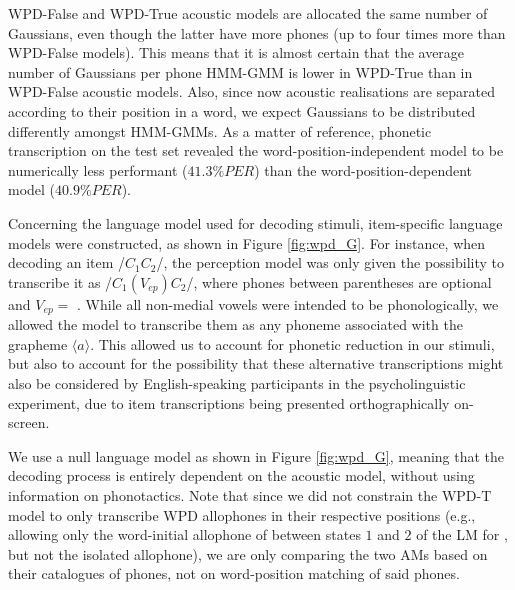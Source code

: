 {WPD-False and WPD-True acoustic models are allocated the same number of Gaussians, even though the latter have more phones (up to four times more than WPD-False models). This means that it is almost certain that the average number of Gaussians per phone HMM-GMM is lower in WPD-True than in WPD-False acoustic models. Also, since now acoustic realisations are separated according to their position in a word, we expect Gaussians to be distributed differently amongst HMM-GMMs. As a matter of reference, phonetic transcription on the test set revealed the word-position-independent model to be numerically less performant ($41.3 \%PER$) than the word-position-dependent model ($40.9 \%PER$).  

Concerning the language model used for decoding stimuli, item-specific language models were constructed, as shown in Figure \ref{fig:wpd_G}. For instance, when decoding an item /$C_{1}C_{2}$/, the perception model was only given the possibility to transcribe it as /$C_{1}(V_{ep})C_{2}$/, where phones between parentheses are optional and $V_{ep} = $ \textipa{[@]}. %
While all non-medial vowels were intended to be  phonologically, we allowed the model to transcribe them as any phoneme associated with the grapheme $\langle a \rangle$. This allowed us to account for phonetic reduction in our stimuli, but also to account for the possibility that these alternative transcriptions might also be considered by English-speaking participants in the psycholinguistic experiment, due to item transcriptions being presented orthographically on-screen.

We use a null language model as shown in Figure \ref{fig:wpd_G}, meaning that the decoding process is entirely dependent on the acoustic model, without using information on phonotactics. Note that since we did not constrain the WPD-T model to only transcribe WPD allophones in their respective positions (e.g., allowing only the word-initial allophone of  between states $1$ and $2$ of the LM for , but not the isolated  allophone), we are only comparing the two AMs based on their catalogues of phones, not on word-position matching of said phones.   

}
